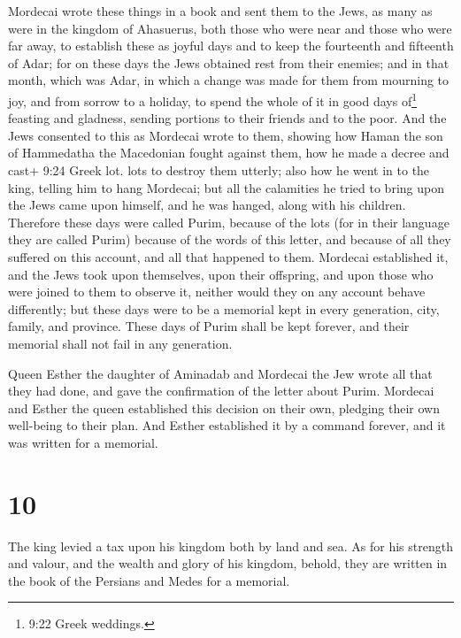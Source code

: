  Mordecai wrote these things in a book and sent them to the
Jews, as many as were in the kingdom of Ahasuerus, both those who were
near and those who were far away,  to establish these as
joyful days and to keep the fourteenth and fifteenth of Adar;
 for on these days the Jews obtained rest from their
enemies; and in that month, which was Adar, in which a change was made
for them from mourning to joy, and from sorrow to a holiday, to spend
the whole of it in good days of\footnote{9:22 Greek weddings.} feasting
and gladness, sending portions to their friends and to the poor.
 And the Jews consented to this as Mordecai wrote to them,
 showing how Haman the son of Hammedatha the Macedonian
fought against them, how he made a decree and cast+ 9:24 Greek lot. lots
to destroy them utterly;  also how he went in to the king,
telling him to hang Mordecai; but all the calamities he tried to bring
upon the Jews came upon himself, and he was hanged, along with his
children.  Therefore these days were called Purim, because
of the lots (for in their language they are called Purim) because of the
words of this letter, and because of all they suffered on this account,
and all that happened to them.  Mordecai established it,
and the Jews took upon themselves, upon their offspring, and upon those
who were joined to them to observe it, neither would they on any account
behave differently; but these days were to be a memorial kept in every
generation, city, family, and province.  These days of
Purim shall be kept forever, and their memorial shall not fail in any
generation.

 Queen Esther the daughter of Aminadab and Mordecai the Jew
wrote all that they had done, and gave the confirmation of the letter
about Purim.  Mordecai and Esther the queen established
this decision on their own, pledging their own well-being to their plan.
 And Esther established it by a command forever, and it was
written for a memorial.

\hypertarget{section-9}{%
\section{10}\label{section-9}}

 The king levied a tax upon his kingdom both by land and
sea.  As for his strength and valour, and the wealth and
glory of his kingdom, behold, they are written in the book of the
Persians and Medes for a memorial.

